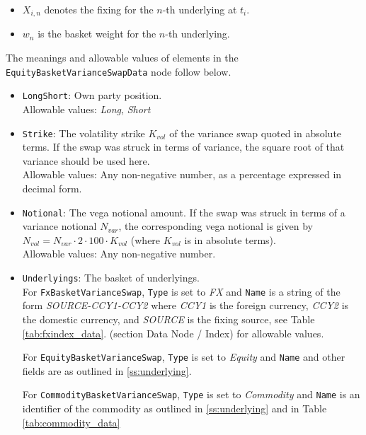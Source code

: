 \begin{itemize}
  \item $X_{i,n}$ denotes the fixing for the $n$-th underlying at $t_i$.
  \item $w_n$ is the basket weight for the $n$-th underlying.
\end{itemize}

The meanings and allowable values of elements in the \lstinline!EquityBasketVarianceSwapData! node follow below.

\begin{itemize}
  \item{} \lstinline!LongShort!: Own party position. \\
    Allowable values: \emph{Long}, \emph{Short}
  \item{} \lstinline!Strike!: The volatility strike $K_{vol}$ of the variance swap quoted in absolute terms.
  If the swap was struck in terms of variance, the square root of that variance should be used here. \\
  Allowable values: Any non-negative number, as a percentage expressed in decimal form.
  \item{} \lstinline!Notional!: The vega notional amount. If the swap was struck in terms of a variance notional
  $N_{var}$, the corresponding vega notional is given by $N_{vol} = N_{var} \cdot 2 \cdot 100 \cdot K_{vol}$ (where
  $K_{vol}$ is in absolute terms). \\
  Allowable values: Any non-negative number.
  \item \lstinline!Underlyings!: The basket of underlyings. \\
    For \lstinline!FxBasketVarianceSwap!, \lstinline!Type! is set to \emph{FX}
    and \lstinline!Name! is a string of the form \emph{SOURCE-CCY1-CCY2} where \emph{CCY1} is
    the foreign currency, \emph{CCY2} is the domestic currency, and \emph{SOURCE} is the fixing
    source, see Table \ref{tab:fxindex_data}.
    (section Data Node / Index) for allowable values.

    For \lstinline!EquityBasketVarianceSwap!, \lstinline!Type! is set to \emph{Equity} and
    \lstinline!Name! and other fields are as outlined in \ref{ss:underlying}.

    For \lstinline!CommodityBasketVarianceSwap!, \lstinline!Type! is set to \emph{Commodity} and
    \lstinline!Name! is an identifier of the commodity as outlined in \ref{ss:underlying} and
    in Table \ref{tab:commodity_data}


\end{itemize}
